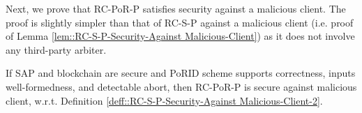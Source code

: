 %  
%     
%     
   

Next, we prove that RC-PoR-P satisfies security against a malicious client. The proof is slightly simpler than that  of RC-S-P against a malicious client (i.e. proof of Lemma \ref{lem::RC-S-P-Security-Against Malicious-Client}) as it does not involve any third-party arbiter. 


\begin{lemma}
 If SAP and blockchain are secure and  PoRID scheme supports correctness, inputs well-formedness, and detectable abort, then RC-PoR-P is secure against malicious client, w.r.t. Definition \ref{deff::RC-S-P-Security-Against Malicious-Client-2}. 
\end{lemma}


